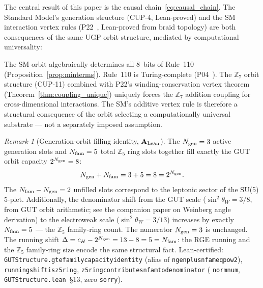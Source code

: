 \documentclass[11pt]{article}
\theoremstyle{remark}
\newtheorem{remark}[theorem]{Remark}
\newcommand{\lean}[1]{%
  \penalty-100
  \begingroup\def\_{\textunderscore\allowbreak}\texttt{#1}\endgroup}
\newcommand{\CatAL}{\ensuremath{\textbf{A}_{\rm Lean}}}
\begin{document}
The central result of this paper is the causal chain~\eqref{eq:causal_chain}.
The Standard Model's generation structure (CUP-4, Lean-proved) and the SM interaction
vertex rules (P22~\cite{Spivack2026_UGPDynamics}, Lean-proved from braid topology) are both consequences of the same
UGP orbit structure, mediated by computational universality:

\begin{tcolorbox}[colback=blue!3,colframe=blue!40!black,left=6pt,right=6pt]
\small
The SM orbit algebraically determines all 8~bits of Rule~110 (Proposition~\ref{prop:minterms}).
Rule~110 is Turing-complete (P04~\cite{Spivack2025_UGPDynamicsUniversality}). The $\mathbb{Z}_7$ orbit structure (CUP-11) combined
with P22's winding-conservation vertex theorem (Theorem~\ref{thm:coupling_unique}) uniquely forces the
$\mathbb{Z}_7$ addition coupling for cross-dimensional interactions. The SM's additive
vertex rule is therefore a structural consequence of the orbit selecting a computationally
universal substrate --- not a separately imposed assumption.
\end{tcolorbox}

\begin{remark}[Generation-orbit filling identity, $\CatAL$]
\label{rem:family_capacity}
The $N_{\rm gen} = 3$ active generation slots and $N_{\rm fam} = 5$ total $\mathbb{Z}_5$
ring slots together fill exactly the GUT orbit capacity $2^{N_{\rm gen}} = 8$:
\[
N_{\rm gen} + N_{\rm fam} = 3 + 5 = 8 = 2^{N_{\rm gen}}.
\]
The $N_{\rm fam} - N_{\rm gen} = 2$ unfilled slots correspond to the leptonic sector
of the SU(5) 5-plet.
Additionally, the denominator shift from the GUT scale ($\sin^2\theta_W = 3/8$, from GUT orbit arithmetic; see the companion paper on Weinberg angle derivation)
to the electroweak scale ($\sin^2\theta_W = 3/13$) increases by exactly $N_{\rm fam} = 5$ ---
the $\mathbb{Z}_5$ family-ring count. The numerator $N_{\rm gen} = 3$ is unchanged.
The running shift $\Delta = c_H - 2^{N_{\rm gen}} = 13 - 8 = 5 = N_{\rm fam}$:
the RGE running and the $\mathbb{Z}_5$ family-ring size encode the same structural fact.
Lean-certified: \lean{GUTStructure.gte\_family\_capacity\_identity}
(alias of \lean{ngen\_plus\_nfam\_eq\_pow2}),
\lean{running\_shift\_is\_z5\_ring}, \lean{z5\_ring\_contributes\_nfam\_to\_denominator}
(\lean{norm\_num}, \lean{GUTStructure.lean}~\S13, zero \texttt{sorry}).
\end{remark}
\end{document}

